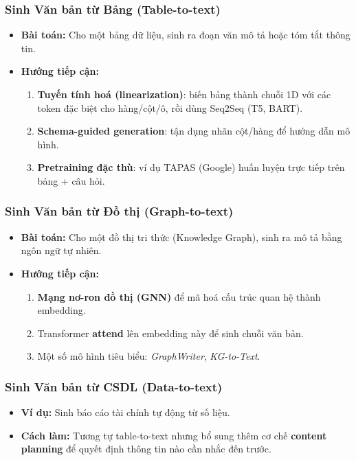 \subsubsection{Sinh Văn bản từ Bảng (Table-to-text)}
\begin{itemize}
    \item \textbf{Bài toán:} Cho một bảng dữ liệu, sinh ra đoạn văn mô tả hoặc tóm tắt thông tin.
    \item \textbf{Hướng tiếp cận:}
    \begin{enumerate}
        \item \textbf{Tuyến tính hoá (linearization)}: biến bảng thành chuỗi 1D với các token đặc biệt cho hàng/cột/ô, rồi dùng Seq2Seq (T5, BART).
        \item \textbf{Schema-guided generation}: tận dụng nhãn cột/hàng để hướng dẫn mô hình.
        \item \textbf{Pretraining đặc thù}: ví dụ TAPAS (Google) huấn luyện trực tiếp trên bảng + câu hỏi.
    \end{enumerate}
\end{itemize}

\subsubsection{Sinh Văn bản từ Đồ thị (Graph-to-text)}
\begin{itemize}
    \item \textbf{Bài toán:} Cho một đồ thị tri thức (Knowledge Graph), sinh ra mô tả bằng ngôn ngữ tự nhiên.
    \item \textbf{Hướng tiếp cận:}
    \begin{enumerate}
        \item \textbf{Mạng nơ-ron đồ thị (GNN)} để mã hoá cấu trúc quan hệ thành embedding.
        \item Transformer \textbf{attend} lên embedding này để sinh chuỗi văn bản.
        \item Một số mô hình tiêu biểu: \textit{GraphWriter}, \textit{KG-to-Text}.
    \end{enumerate}
\end{itemize}

\subsubsection{Sinh Văn bản từ CSDL (Data-to-text)}
\begin{itemize}
    \item \textbf{Ví dụ:} Sinh báo cáo tài chính tự động từ số liệu.
    \item \textbf{Cách làm:} Tương tự table-to-text nhưng bổ sung thêm cơ chế \textbf{content planning} để quyết định thông tin nào cần nhắc đến trước.
\end{itemize}
